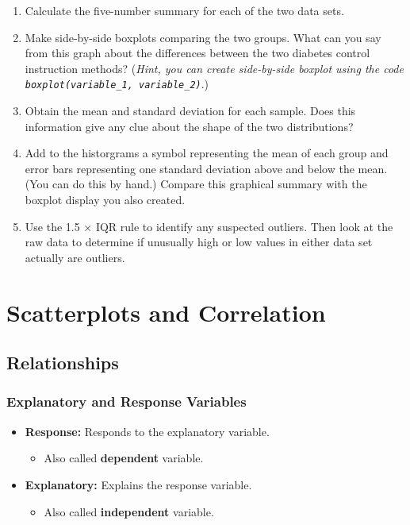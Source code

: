 \documentclass[
  letterpaper,
  DIV=11,
  numbers=noendperiod]{scrreprt}
\providecommand{\tightlist}{%
  \setlength{\itemsep}{0pt}\setlength{\parskip}{0pt}}\usepackage{longtable,booktabs,array}
\begin{document}
\begin{enumerate}
\def\labelenumi{\alph{enumi}.}
\tightlist
\item
  Calculate the five-number summary for each of the two data sets.
\item
  Make side-by-side boxplots comparing the two groups. What can you say
  from this graph about the differences between the two diabetes control
  instruction methods? (\emph{Hint, you can create side-by-side boxplot
  using the code \texttt{boxplot(variable\_1,\ variable\_2)}}.)
\item
  Obtain the mean and standard deviation for each sample. Does this
  information give any clue about the shape of the two distributions?
\item
  Add to the historgrams a symbol representing the mean of each group
  and error bars representing one standard deviation above and below the
  mean. (You can do this by hand.) Compare this graphical summary with
  the boxplot display you also created.
\item
  Use the 1.5 × IQR rule to identify any suspected outliers. Then look
  at the raw data to determine if unusually high or low values in either
  data set actually are outliers.
\end{enumerate}

\hypertarget{scatterplots-and-correlation}{%
\chapter{Scatterplots and
Correlation}\label{scatterplots-and-correlation}}

\hypertarget{relationships}{%
\section{Relationships}\label{relationships}}

\hypertarget{explanatory-and-response-variables}{%
\subsection{Explanatory and Response
Variables}\label{explanatory-and-response-variables}}

\begin{itemize}
\tightlist
\item
  \textbf{Response:} Responds to the explanatory variable.

  \begin{itemize}
  \tightlist
  \item
    Also called \textbf{dependent} variable.
  \end{itemize}
\item
  \textbf{Explanatory:} Explains the response variable.

  \begin{itemize}
  \tightlist
  \item
    Also called \textbf{independent} variable.
  \end{itemize}
\end{itemize}
\end{document}
